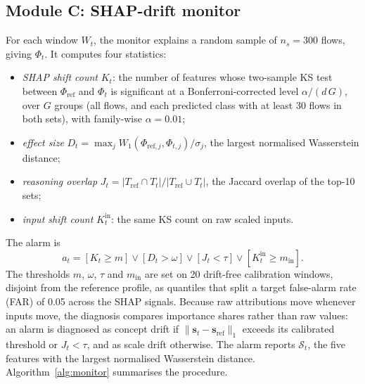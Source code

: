 \documentclass[pdflatex,sn-mathphys-num]{sn-jnl}%
\begin{document}
\subsection{Module C: SHAP-drift monitor}
For each window $W_t$, the monitor explains a random sample of $n_s=300$ flows, giving $\Phi_t$. It computes four statistics:
\begin{itemize}
\item \textit{SHAP shift count} $K_t$: the number of features whose two-sample KS test between $\Phi_{\text{ref}}$ and $\Phi_t$ is significant at a Bonferroni-corrected level $\alpha/(d\,G)$, over $G$ groups (all flows, and each predicted class with at least 30 flows in both sets), with family-wise $\alpha=0.01$;
\item \textit{effect size} $D_t=\max_j W_1(\Phi_{\text{ref},j},\Phi_{t,j})/\sigma_j$, the largest normalised Wasserstein distance;
\item \textit{reasoning overlap} $J_t=|T_{\text{ref}}\cap T_t|/|T_{\text{ref}}\cup T_t|$, the Jaccard overlap of the top-10 sets;
\item \textit{input shift count} $K^{\text{in}}_t$: the same KS count on raw scaled inputs.
\end{itemize}
The alarm is
\begin{equation}
a_t = [K_t\ge m]\lor[D_t>\omega]\lor[J_t<\tau]\lor[K^{\text{in}}_t\ge m_{\text{in}}].
\end{equation}
The thresholds $m$, $\omega$, $\tau$ and $m_{\text{in}}$ are set on 20 drift-free calibration windows, disjoint from the reference profile, as quantiles that split a target false-alarm rate (FAR) of 0.05 across the SHAP signals. Because raw attributions move whenever inputs move, the diagnosis compares importance shares rather than raw values: an alarm is diagnosed as concept drift if $\|\mathbf{s}_t-\mathbf{s}_{\text{ref}}\|_1$ exceeds its calibrated threshold or $J_t<\tau$, and as scale drift otherwise. The alarm reports $\mathcal{S}_t$, the five features with the largest normalised Wasserstein distance. Algorithm~\ref{alg:monitor} summarises the procedure.
\end{document}
